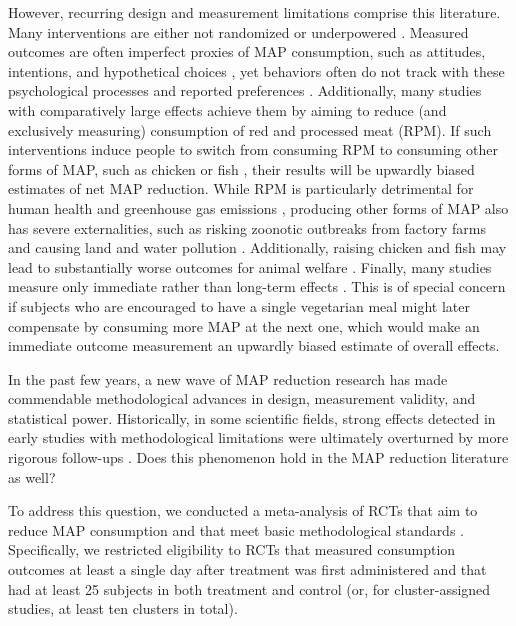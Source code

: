 \documentclass[sn-nature,referee,pdflatex]{sn-jnl}
\begin{document}
However, recurring design and measurement limitations comprise this
literature. Many interventions are either not randomized
\citep{garnett2020} or underpowered \citep{delichatsios2001}. Measured
outcomes are often imperfect proxies of MAP consumption, such as
attitudes, intentions, and hypothetical choices
\citep{raghoebar2020, vermeer2010}, yet behaviors often do not track
with these psychological processes
\citep{mathur2021effectiveness, porat2024} and reported preferences
\citep{hensher2010}. Additionally, many studies with comparatively large
effects achieve them by aiming to reduce (and exclusively measuring)
consumption of red and processed meat (RPM). If such interventions
induce people to switch from consuming RPM to consuming other forms of
MAP, such as chicken or fish \citep{grummon2023}, their results will be
upwardly biased estimates of net MAP reduction. While RPM is
particularly detrimental for human health and greenhouse gas emissions
\citep{abete2014, lescinsky2022}, producing other forms of MAP also has
severe externalities, such as risking zoonotic outbreaks from factory
farms \citep{hafez2020} and causing land and water pollution
\citep{grvzinic2023}. Additionally, raising chicken and fish may lead to
substantially worse outcomes for animal welfare
\citep{mathur2022ethical}. Finally, many studies measure only immediate
rather than long-term effects \citep{hansen2021, griesoph2021}. This is
of special concern if subjects who are encouraged to have a single
vegetarian meal might later compensate by consuming more MAP at the next
one, which would make an immediate outcome measurement an upwardly
biased estimate of overall effects.

In the past few years, a new wave of MAP reduction research has made
commendable methodological advances in design, measurement validity, and
statistical power. Historically, in some scientific fields, strong
effects detected in early studies with methodological limitations were
ultimately overturned by more rigorous follow-ups
\citep{wykes2008, paluck2019, scheel2021}. Does this phenomenon hold in
the MAP reduction literature as well?

To address this question, we conducted a meta-analysis of RCTs that aim
to reduce MAP consumption and that meet basic methodological standards
\citep{andersson2021, kanchanachitra2020, abrahamse2007, acharya2004, banerjee2019, bianchi2022, bochmann2017, bschaden2020, carfora2023, cooney2014, cooney2016, feltz2022, haile2021, hatami2018, hennessy2016, jalil2023, mathur2021effectiveness, merrill2009, norris2014, peacock2017, polanco2022, sparkman2021, weingarten2022, piester2020, aberman2018, aldoh2023, allen2002, camp2019, coker2022, sparkman2020, berndsen2005, bertolaso2015, fehrenbach2015, mattson2020, shreedhar2021}.
Specifically, we restricted eligibility to RCTs that measured
consumption outcomes at least a single day after treatment was first
administered and that had at least 25 subjects in both treatment and
control (or, for cluster-assigned studies, at least ten clusters in
total).
\end{document}
